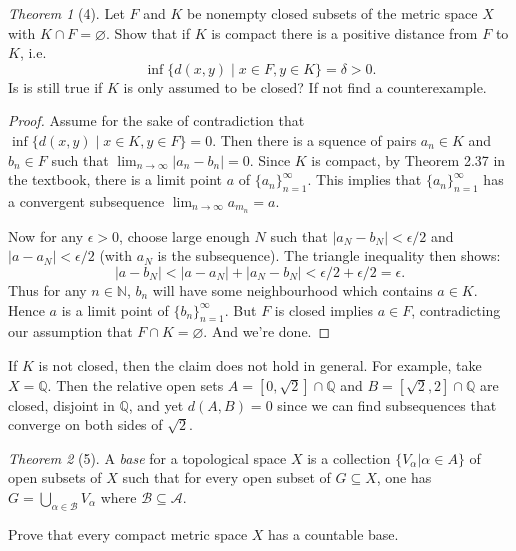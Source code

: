 \documentclass[12pt]{article}
\theoremstyle{remark}
\theoremstyle{named}
\newtheorem*{theorem}{Theorem}
\begin{document}
\newpage

\begin{theorem}[4]
    Let \(F\) and \(K\) be nonempty closed subsets of the metric space \(X\) with \(K \cap F = \varnothing\). Show that if \(K\) is compact there is a positive distance from \(F\) to \(K\), i.e.
    \[\inf \{d(x, y) \mid x \in F, y \in K\} = \delta > 0.\]
    Is is still true if \(K\) is only assumed to be closed? If not find a counterexample.
\end{theorem}

\begin{proof}
    Assume for the sake of contradiction that \(\inf \{d(x, y) \mid x \in K, y \in F\} = 0\). Then there is a squence of pairs \(a_n \in K\) and \(b_n \in F\) such that \(\lim_{n \rightarrow \infty} |a_n - b_n| = 0\). Since \(K\) is compact, by Theorem 2.37 in the textbook, there is a limit point \(a\) of \(\{a_n\}_{n = 1}^\infty\). This implies that \(\{a_n\}_{n = 1}^\infty\) has a convergent subsequence \(\lim_{n \rightarrow \infty} a_{m_n} = a\). 

    Now for any \(\epsilon > 0\), choose large enough \(N\) such that \(|a_N - b_N| < \epsilon / 2\) and \(|a - a_{N}| < \epsilon / 2\) (with \(a_N\) is the subsequence). The triangle inequality then shows:
    \[|a - b_N| < |a - a_N| + |a_N - b_N| < \epsilon / 2 + \epsilon / 2 = \epsilon.\]
    Thus for any \(n \in \mathbb N\), \(b_n\) will have some neighbourhood which contains \(a \in K\). Hence \(a\) is a limit point of \(\{b_n\}_{n = 1}^\infty\). But \(F\) is closed implies \(a \in F\), contradicting our assumption that \(F \cap K = \varnothing\). And we're done.
\end{proof}

If \(K\) is not closed, then the claim does not hold in general. For example, take \(X = \mathbb Q\). Then the relative open sets \(A = [0, \sqrt 2] \cap \mathbb Q\) and \(B = [\sqrt 2, 2] \cap \mathbb Q\) are closed, disjoint in \(\mathbb Q\), and yet \(d(A, B) = 0\) since we can find subsequences that converge on both sides of \(\sqrt 2\).
\newpage

\begin{theorem}[5]
    A \textit{base} for a topological space \(X\) is a collection \(\{V_{\alpha} | \alpha \in A\}\) of open subsets of \(X\) such that for every open subset of \(G \subseteq X\), one has \(G = \bigcup_{\alpha \in \mathcal B} V_{\alpha}\) where \(\mathcal B \subseteq \mathcal A\).

    Prove that every compact metric space \(X\) has a countable base.
\end{theorem}
\end{document}
